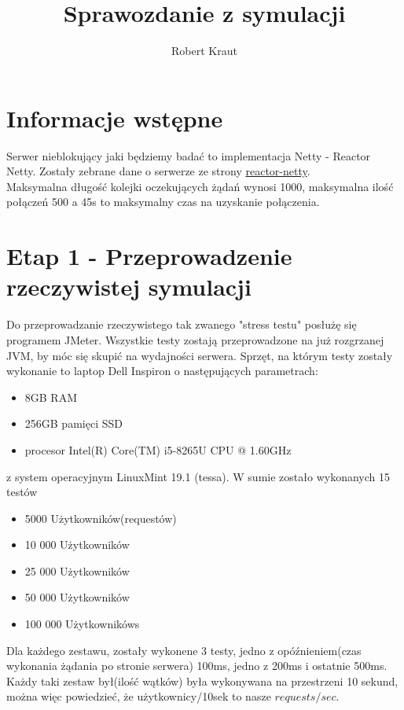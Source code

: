\documentclass{article}
\title{Sprawozdanie z symulacji}
\author{Robert Kraut}
\begin{document}
    \maketitle


    \section{Informacje wstępne}
    Serwer nieblokujący jaki będziemy badać to implementacja Netty - Reactor Netty.
    Zostały zebrane dane o serwerze ze strony \href{https://projectreactor.io/docs/netty/release/reference/index.html}{reactor-netty}. \\
    Maksymalna długość kolejki oczekujących żądań wynosi 1000, maksymalna ilość połączeń 500 a 45s
    to maksymalny czas na uzyskanie połączenia.


    \section{Etap 1 - Przeprowadzenie rzeczywistej symulacji}
    Do przeprowadzanie rzeczywistego tak zwanego "stress testu" posłużę się programem JMeter. \newline
    Wszystkie testy zostają przeprowadzone na już rozgrzanej JVM, by móc się skupić na wydajności serwera. \newline
    Sprzęt, na którym testy zostały wykonanie to laptop Dell Inspiron o następujących parametrach:
    \begin{itemize}
        \item 8GB RAM
        \item 256GB pamięci SSD
        \item procesor Intel(R) Core(TM) i5-8265U CPU @ 1.60GHz
    \end{itemize} z system operacyjnym LinuxMint 19.1 (tessa). \newline
    W sumie zostało wykonanych 15 testów
    \begin{itemize}
        \item 5000 Użytkowników(requestów)
        \item 10 000 Użytkowników
        \item 25 000 Użytkowników
        \item 50 000 Użytkowników
        \item 100 000 Użytkownikóws
    \end{itemize}
    Dla każdego zestawu, zostały wykonene 3 testy, jedno z opóźnieniem(czas wykonania żądania po stronie serwera) \newline
    100ms, jedno z 200ms i ostatnie 500ms.
    Każdy taki zestaw był(ilość wątków) była wykonywana na przestrzeni 10 sekund, można więc powiedzieć, że \newline
    użytkownicy/10sek to nasze \(requests/sec\).
\end{document}
